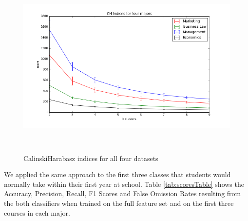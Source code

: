\documentclass{sigchi}
\begin{document}
\begin{figure}
\centering
  \includegraphics[width=0.4\columnwidth]{figures/ch-4-majors.png}
  \caption{Calinski\-Harabasz indices for all four datasets}~\label{fig:CHindex}
\end{figure}

We applied the same approach to the first three classes that students would normally take within their first year at school. Table \ref{tab:scoresTable} shows the Accuracy, Precision, Recall, F1 Scores and False Omission Rates resulting from the both classifiers when trained on the full feature set and on the first three courses in each major. 
\end{document}
